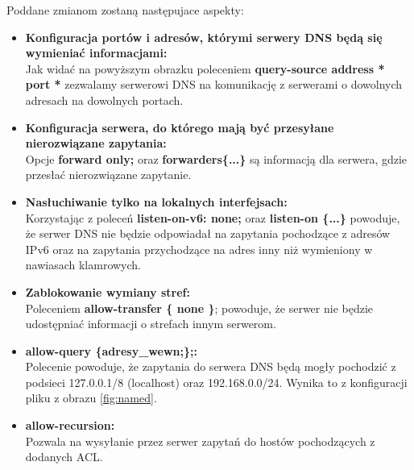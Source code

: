 \documentclass[12pt, a4paper]{article}
\begin{document}
        Poddane zmianom zostaną następujace aspekty:
        \begin{itemize}
            \item \textbf{Konfiguracja portów i adresów, którymi serwery DNS będą się wymieniać informacjami:} \\ Jak widać na powyższym obrazku poleceniem \textbf{query-source address * port *} zezwalamy serwerowi DNS na komunikację z serwerami o dowolnych adresach na dowolnych portach.
            \item \textbf{Konfiguracja serwera, do którego mają być przesyłane nierozwiązane zapytania:} \\ Opcje \textbf{forward only;} oraz \textbf{forwarders\{...\}} są informacją dla serwera, gdzie przesłać nierozwiązane zapytanie.
            \item \textbf{Nasłuchiwanie tylko na lokalnych interfejsach:} \\  Korzystając z poleceń \textbf{listen-on-v6: none; } oraz \textbf{listen-on \{...\}} powoduje, że serwer DNS nie będzie odpowiadał na zapytania pochodzące z adresów IPv6 oraz na zapytania przychodzące na adres inny niż wymieniony w nawiasach klamrowych.
            \item \textbf{Zablokowanie wymiany stref:} \\ Poleceniem \textbf{allow-transfer \{ none \}}; powoduje, że serwer nie będzie udostępniać informacji o strefach innym serwerom.
            \item \textbf{allow-query \{adresy\_wewn;\};:} \\ Polecenie powoduje, że zapytania do serwera DNS będą mogły pochodzić z podsieci 127.0.0.1/8 (localhost) oraz 192.168.0.0/24. Wynika to z konfiguracji pliku z obrazu \ref{fig:named}.
            \item \textbf{allow-recursion:} \\ Pozwala na wysyłanie przez serwer zapytań do hostów pochodzących z dodanych ACL.
        \end{itemize}
        
            
\end{document}
